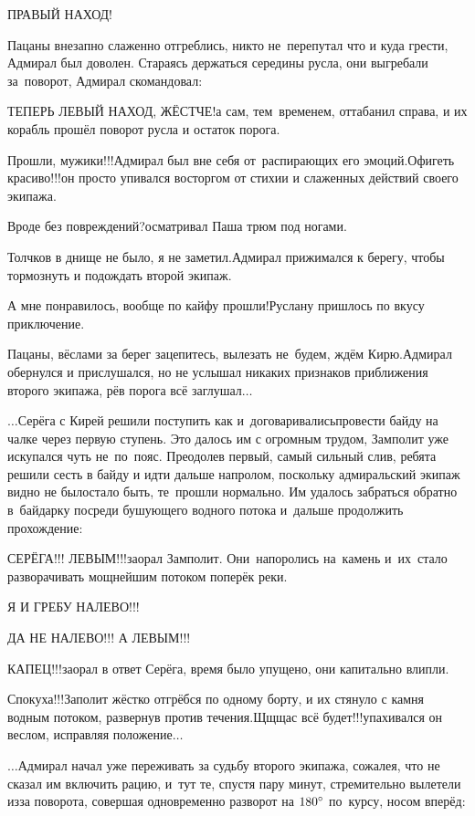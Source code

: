 \diagdash ПРАВЫЙ НАХОД!

Пацаны внезапно слаженно отгреблись, никто не~перепутал что и куда грести, Адмирал был доволен. Стараясь держаться середины русла, они выгребали за~поворот, Адмирал скомандовал:

\diagdash ТЕПЕРЬ ЛЕВЫЙ НАХОД, ЖЁСТЧЕ!\mdash а сам, тем~временем, оттабанил справа, и их корабль прошёл поворот русла и остаток порога.

\diagdash Прошли, мужики!!!\mdash Адмирал был вне себя от~распирающих его эмоций.\mdash Офигеть красиво!!!\mdash он просто упивался восторгом от стихии и слаженных действий своего экипажа.

\diagdash Вроде без повреждений?\mdash осматривал Паша трюм под ногами.

\diagdash Толчков в днище не было, я не заметил.\mdash Адмирал прижимался к берегу, чтобы тормознуть и подождать второй экипаж.

\diagdash А мне понравилось, вообще по кайфу прошли!\mdash Руслану пришлось по вкусу приключение.

\diagdash Пацаны, вёслами за берег зацепитесь, вылезать не~будем, ждём Кирю.\mdash Адмирал обернулся и прислушался, но не услышал никаких признаков приближения второго экипажа, рёв порога всё заглушал$\ldots$

$\ldots$Серёга с Кирей решили поступить как и~договаривались\mdash провести байду на чалке через первую ступень. Это далось им с огромным трудом, Замполит уже искупался чуть не~по~пояс. Преодолев первый, самый сильный слив, ребята решили сесть в байду и идти дальше напролом, поскольку адмиральский экипаж видно не было\mdash стало быть, те~прошли нормально. Им удалось забраться обратно в~байдарку посреди бушующего водного потока и~дальше продолжить прохождение:

\diagdash СЕРЁГА!!! ЛЕВЫМ!!!\mdash заорал Замполит. Они~напоролись на~камень и~их~стало разворачивать мощнейшим потоком поперёк реки.

\diagdash Я И ГРЕБУ НАЛЕВО!!!

\diagdash ДА НЕ НАЛЕВО!!! А ЛЕВЫМ!!!

\diagdash КАПЕЦ!!!\mdash заорал в ответ Серёга, время было упущено, они капитально влипли.

\diagdash Спокуха!!!\mdash Заполит жёстко отгрёбся по одному борту, и их стянуло с камня водным потоком, развернув против течения.\mdash Щ\sdash щ\sdash щас всё будет!!!\mdash упахивался он веслом, исправляя положение$\ldots$

$\ldots$Адмирал начал уже переживать за судьбу второго экипажа, сожалея, что не сказал им включить рацию, и~тут те, спустя пару минут, стремительно вылетели из\sdash за поворота, совершая одновременно разворот на $180\degree$ по~курсу, носом вперёд:


